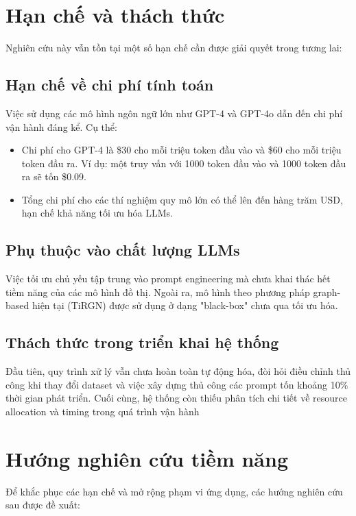 \section{Hạn chế và thách thức}
Nghiên cứu này vẫn tồn tại một số hạn chế cần được giải quyết trong tương lai:

\subsection{Hạn chế về chi phí tính toán}
Việc sử dụng các mô hình ngôn ngữ lớn như GPT-4 và GPT-4o dẫn đến chi phí vận hành đáng kể. Cụ thể:
\begin{itemize}
\item Chi phí cho GPT-4 là \$30 cho mỗi triệu token đầu vào và \$60 cho mỗi triệu token đầu ra. Ví dụ: một truy vấn với 1000 token đầu vào và 1000 token đầu ra sẽ tốn \$0.09.
\item Tổng chi phí cho các thí nghiệm quy mô lớn có thể lên đến hàng trăm USD, hạn chế khả năng tối ưu hóa LLMs.
\end{itemize}

\subsection{Phụ thuộc vào chất lượng LLMs}
Việc tối ưu chủ yếu tập trung vào prompt engineering mà chưa khai thác hết tiềm năng của các mô hình đồ thị. Ngoài ra, mô hình theo phương pháp graph-based hiện tại (TiRGN) được sử dụng ở dạng "black-box" chưa qua tối ưu hóa.

\subsection{Thách thức trong triển khai hệ thống}
Đầu tiên, quy trình xử lý vẫn chưa hoàn toàn tự động hóa, đòi hỏi điều chỉnh thủ công khi thay đổi dataset và việc xây dựng thủ công các prompt tốn khoảng 10\% thời gian phát triển. Cuối cùng, hệ thống còn thiếu phân tích chi tiết về resource allocation và timing trong quá trình vận hành

\section{Hướng nghiên cứu tiềm năng}
Để khắc phục các hạn chế và mở rộng phạm vi ứng dụng, các hướng nghiên cứu sau được đề xuất:

